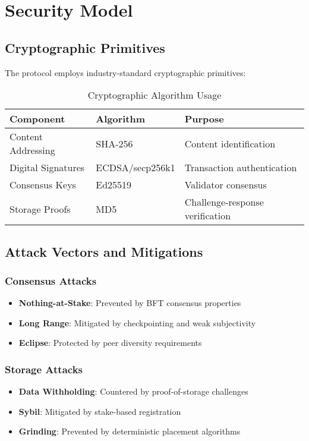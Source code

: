 \documentclass[11pt,a4paper]{article}
\begin{document}
\section{Security Model}

\subsection{Cryptographic Primitives}

The protocol employs industry-standard cryptographic primitives:

\begin{table}[H]
  \centering
  \begin{tabular}{|l|l|l|}
    \hline
    \textbf{Component} & \textbf{Algorithm} & \textbf{Purpose} \\
    \hline
    Content Addressing & SHA-256 & Content identification \\
    Digital Signatures & ECDSA/secp256k1 & Transaction authentication \\
    Consensus Keys & Ed25519 & Validator consensus \\
    Storage Proofs & MD5 & Challenge-response verification \\
    \hline
  \end{tabular}
  \caption{Cryptographic Algorithm Usage}
\end{table}

\subsection{Attack Vectors and Mitigations}

\subsubsection{Consensus Attacks}
\begin{itemize}
  \item \textbf{Nothing-at-Stake}: Prevented by BFT consensus properties
  \item \textbf{Long Range}: Mitigated by checkpointing and weak subjectivity
  \item \textbf{Eclipse}: Protected by peer diversity requirements
\end{itemize}

\subsubsection{Storage Attacks}
\begin{itemize}
  \item \textbf{Data Withholding}: Countered by proof-of-storage challenges
  \item \textbf{Sybil}: Mitigated by stake-based registration
  \item \textbf{Grinding}: Prevented by deterministic placement algorithms
\end{itemize}
\end{document}
